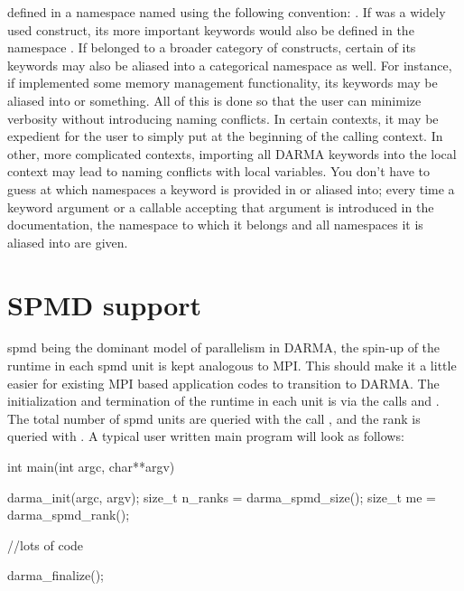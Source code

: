 defined in a namespace named using the following convention:
.
If  was a 
widely used construct, its more important keywords would also be defined in the namespace
.  If  belonged to a broader category of 
constructs, certain of its keywords may also be aliased into a categorical namespace
as well.  For instance, if  implemented some memory management functionality,
its keywords may be aliased into  or 
something.  All of this is done so that the user can minimize verbosity without introducing
naming conflicts.  In certain contexts, it may be expedient for the user to simply
put  at the beginning of the calling context.  In other,
more complicated contexts, importing all DARMA keywords into the local context may
lead to naming conflicts with local variables.  You don't have to guess at which namespaces
a keyword is provided in or aliased into; every time a keyword argument or a callable
accepting that argument is introduced in the documentation, the namespace to which 
it belongs and all namespaces it is aliased into are given.



\section{SPMD support}
\label{sec:spmd}
\gls{spmd} being the dominant model of parallelism in DARMA,  the spin-up of the
runtime in each \gls{spmd} unit is kept analogous to MPI. This should make it a little easier for existing MPI based application codes to transition 
to DARMA. The initialization and termination of the runtime in each unit is via the calls 
and . The total number of \gls{spmd} units are queried with the call ,
and the rank is queried with . A typical user written main program will look as follows:
\begin{CppCode}
int main(int argc, char**argv){

	darma_init(argc, argv);
	size_t n_ranks = darma_spmd_size();
	size_t me = darma_spmd_rank();

	//lots of code

	darma_finalize();
}
\end{CppCode}

